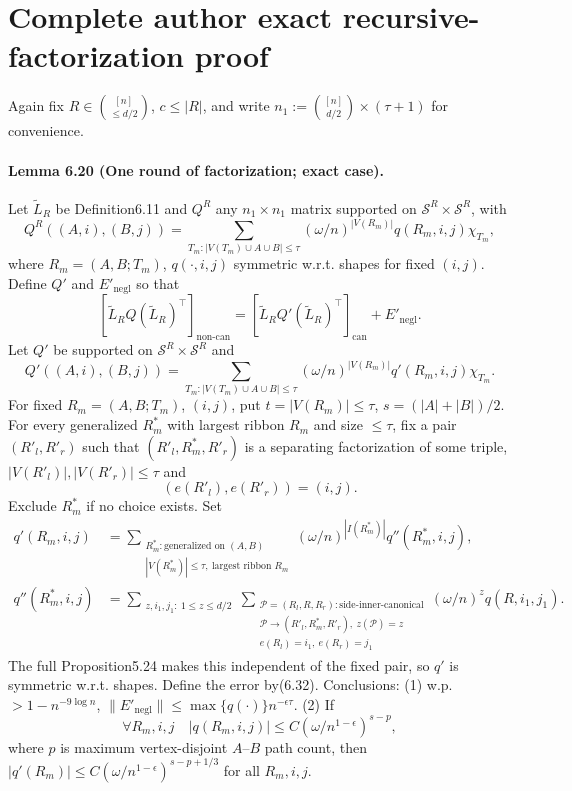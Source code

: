 \section*{Complete author exact recursive-factorization proof}
Again fix $R\in\binom{[n]}{\le d/2}$, $c\le|R|$, and write $n_1:=\binom{[n]}{d/2}\times(\tau+1)$ for convenience.
\paragraph{Lemma 6.20 (One round of factorization; exact case).} Let $\widetilde L_R$ be Definition6.11 and $Q^R$ any $n_1\times n_1$ matrix supported on $\mathcal S^R\times\mathcal S^R$, with
\[Q^R((A,i),(B,j))=\sum_{T_m:|V(T_m)\cup A\cup B|\le\tau}(\omega/n)^{|V(R_m)|}q(R_m,i,j)\chi_{T_m},\tag{6.31}\]
where $R_m=(A,B;T_m)$, $q(\cdot,i,j)$ symmetric w.r.t. shapes for fixed $(i,j)$. Define $Q'$ and $E'_{\mathrm{negl}}$ so that
\[[\widetilde L_RQ(\widetilde L_R)^\top]_{\mathrm{non\text{-}can}}=[\widetilde L_RQ'(\widetilde L_R)^\top]_{\mathrm{can}}+E'_{\mathrm{negl}}.\tag{6.32}\]
Let $Q'$ be supported on $\mathcal S^R\times\mathcal S^R$ and
\[Q'((A,i),(B,j))=\sum_{T_m:|V(T_m)\cup A\cup B|\le\tau}(\omega/n)^{|V(R_m)|}q'(R_m,i,j)\chi_{T_m}.\tag{6.33}\]
For fixed $R_m=(A,B;T_m)$, $(i,j)$, put $t=|V(R_m)|\le\tau$, $s=(|A|+|B|)/2$. For every generalized $R^*_m$ with largest ribbon $R_m$ and size $\le\tau$, fix a pair $(R'_l,R'_r)$ such that $(R'_l,R^*_m,R'_r)$ is a separating factorization of some triple, $|V(R'_l)|,|V(R'_r)|\le\tau$ and
\[(e(R'_l),e(R'_r))=(i,j).\tag{6.34}\]
Exclude $R^*_m$ if no choice exists. Set
\begin{align*}q'(R_m,i,j)&=\sum_{\substack{R^*_m:\text{generalized on }(A,B)\\|V(R^*_m)|\le\tau,\ \text{largest ribbon }R_m}}(\omega/n)^{|I(R^*_m)|}q''(R^*_m,i,j),\\q''(R^*_m,i,j)&=\sum_{\substack{z,i_1,j_1:\ 1\le z\le d/2}}\sum_{\substack{\mathcal P=(R_l,R,R_r):\text{side-inner-canonical}\\\mathcal P\to(R'_l,R^*_m,R'_r),\ z(\mathcal P)=z\\e(R_l)=i_1,\ e(R_r)=j_1}}(\omega/n)^zq(R,i_1,j_1).\tag{6.35}\end{align*}
The full Proposition5.24 makes this independent of the fixed pair, so $q'$ is symmetric w.r.t. shapes. Define the error by(6.32). Conclusions: (1) w.p. $>1-n^{-9\log n}$, $\|E'_{\mathrm{negl}}\|\le\max\{q(\cdot)\}n^{-\epsilon\tau}$. (2) If
\[\forall R_m,i,j\quad|q(R_m,i,j)|\le C(\omega/n^{1-\epsilon})^{s-p},\tag{6.36}\]
where $p$ is maximum vertex-disjoint $A$--$B$ path count, then $|q'(R_m)|\le C(\omega/n^{1-\epsilon})^{s-p+1/3}$ for all $R_m,i,j$.
